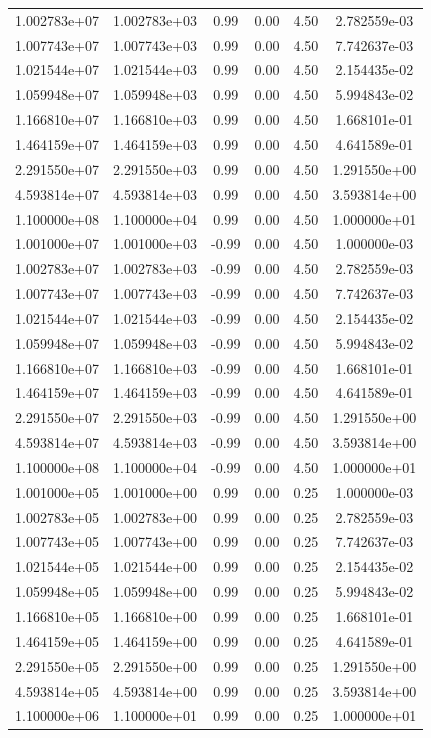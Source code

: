\documentclass{article}
\begin{document}
\begin{table}[htbp]
\begin{tabular}{cccccc}
1.002783e+07 & 1.002783e+03 & 0.99 & 0.00 & 4.50 & 2.782559e-03 \\
1.007743e+07 & 1.007743e+03 & 0.99 & 0.00 & 4.50 & 7.742637e-03 \\
1.021544e+07 & 1.021544e+03 & 0.99 & 0.00 & 4.50 & 2.154435e-02 \\
1.059948e+07 & 1.059948e+03 & 0.99 & 0.00 & 4.50 & 5.994843e-02 \\
1.166810e+07 & 1.166810e+03 & 0.99 & 0.00 & 4.50 & 1.668101e-01 \\
1.464159e+07 & 1.464159e+03 & 0.99 & 0.00 & 4.50 & 4.641589e-01 \\
2.291550e+07 & 2.291550e+03 & 0.99 & 0.00 & 4.50 & 1.291550e+00 \\
4.593814e+07 & 4.593814e+03 & 0.99 & 0.00 & 4.50 & 3.593814e+00 \\
1.100000e+08 & 1.100000e+04 & 0.99 & 0.00 & 4.50 & 1.000000e+01 \\
1.001000e+07 & 1.001000e+03 & -0.99 & 0.00 & 4.50 & 1.000000e-03 \\
1.002783e+07 & 1.002783e+03 & -0.99 & 0.00 & 4.50 & 2.782559e-03 \\
1.007743e+07 & 1.007743e+03 & -0.99 & 0.00 & 4.50 & 7.742637e-03 \\
1.021544e+07 & 1.021544e+03 & -0.99 & 0.00 & 4.50 & 2.154435e-02 \\
1.059948e+07 & 1.059948e+03 & -0.99 & 0.00 & 4.50 & 5.994843e-02 \\
1.166810e+07 & 1.166810e+03 & -0.99 & 0.00 & 4.50 & 1.668101e-01 \\
1.464159e+07 & 1.464159e+03 & -0.99 & 0.00 & 4.50 & 4.641589e-01 \\
2.291550e+07 & 2.291550e+03 & -0.99 & 0.00 & 4.50 & 1.291550e+00 \\
4.593814e+07 & 4.593814e+03 & -0.99 & 0.00 & 4.50 & 3.593814e+00 \\
1.100000e+08 & 1.100000e+04 & -0.99 & 0.00 & 4.50 & 1.000000e+01 \\
1.001000e+05 & 1.001000e+00 & 0.99 & 0.00 & 0.25 & 1.000000e-03 \\
1.002783e+05 & 1.002783e+00 & 0.99 & 0.00 & 0.25 & 2.782559e-03 \\
1.007743e+05 & 1.007743e+00 & 0.99 & 0.00 & 0.25 & 7.742637e-03 \\
1.021544e+05 & 1.021544e+00 & 0.99 & 0.00 & 0.25 & 2.154435e-02 \\
1.059948e+05 & 1.059948e+00 & 0.99 & 0.00 & 0.25 & 5.994843e-02 \\
1.166810e+05 & 1.166810e+00 & 0.99 & 0.00 & 0.25 & 1.668101e-01 \\
1.464159e+05 & 1.464159e+00 & 0.99 & 0.00 & 0.25 & 4.641589e-01 \\
2.291550e+05 & 2.291550e+00 & 0.99 & 0.00 & 0.25 & 1.291550e+00 \\
4.593814e+05 & 4.593814e+00 & 0.99 & 0.00 & 0.25 & 3.593814e+00 \\
1.100000e+06 & 1.100000e+01 & 0.99 & 0.00 & 0.25 & 1.000000e+01 \\
\hline
\end{tabular}
\end{table}
\end{document}

